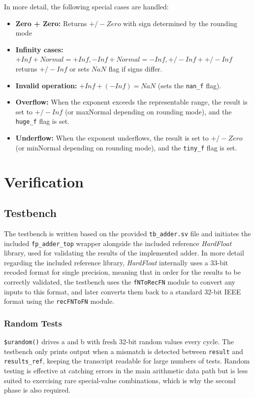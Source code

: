 \documentclass[12pt]{report}
\begin{document}
\noindent In more detail, the following special cases are handled:
\begin{itemize}
    \item \textbf{Zero + Zero:} Returns $+/-Zero$ with sign determined by the rounding mode
    \item \textbf{Infinity cases:} $+Inf + Normal = +Inf, -Inf + Normal = −Inf, +/-Inf + +/-Inf$ returns $+/-Inf$ or sets $NaN$ flag if signs differ.
    \item \textbf{Invalid operation:} $+Inf + (−Inf) = NaN$ (sets the \lstinline{nan_f} flag).
    \item \textbf{Overflow:} When the exponent exceeds the representable range, the result is set to $+/-Inf$ (or maxNormal depending on rounding mode), and the \lstinline{huge_f} flag is set.
    \item \textbf{Underflow:} When the exponent underflows, the result is set to $+/-Zero$ (or minNormal depending on rounding mode), and the \lstinline{tiny_f} flag is set.
\end{itemize}


\chapter{Verification}
\section{Testbench}
The testbench is written based on the provided \lstinline{tb_adder.sv} file and initiates the included \lstinline{fp_adder_top} wrapper alongside the included reference \textit{HardFloat} library, used for validating the results of the implemented adder. In more detail regarding the included reference library, \textit{HardFloat} internally uses a 33-bit recoded format for single precision, meaning that in order for the results to be correctly validated, the testbench uses the \lstinline{fNToRecFN} module to convert any inputs to this format, and later converts them back to a standard 32-bit IEEE format using the \lstinline{recFNToFN} module.

\subsection{Random Tests}
\lstinline{$urandom()} drives a and b with fresh 32-bit random values every cycle. The testbench only prints output when a mismatch is detected between \lstinline{result} and \lstinline{results_ref}, keeping the transcript readable for large numbers of tests. Random testing is effective at catching errors in the main arithmetic data path but is less suited to exercising rare special-value combinations, which is why the second phase is also required.
\end{document}
